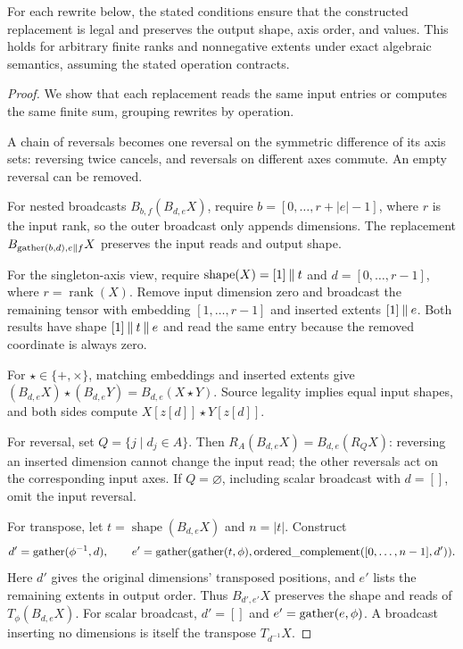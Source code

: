 \begin{lemma}
\label{lem:certified-extensions}
For each rewrite below, the stated conditions ensure that the
constructed replacement is legal and preserves the output shape,
axis order, and values. This holds for arbitrary finite ranks and
nonnegative extents under exact algebraic semantics, assuming
the stated operation contracts.
\end{lemma}
\begin{proof}
We show that each replacement reads the same input entries or computes
the same finite sum, grouping rewrites by operation.

A chain of reversals becomes one reversal on the symmetric difference
of its axis sets: reversing twice cancels, and reversals on different
axes commute. An empty reversal can be removed.

For nested broadcasts $B_{b,f}(B_{d,e}X)$, require
$b=[0,\ldots,r+|e|-1]$, where $r$ is the input rank, so the outer broadcast
only appends dimensions. The replacement $B_{\operatorname{gather}(b,d),e\mathbin{\Vert} f}X$
preserves the input reads and output shape.

For the singleton-axis view, require
$\operatorname{shape}(X)=[1]\mathbin{\Vert} t$ and $d=[0,\ldots,r-1]$,
where $r=\operatorname{rank}(X)$.
Remove input dimension zero and broadcast the remaining tensor with
embedding $[1,\ldots,r-1]$ and inserted extents $[1]\mathbin{\Vert} e$.
Both results have shape $[1]\mathbin{\Vert} t\mathbin{\Vert} e$ and read the same entry
because the removed coordinate is always zero.

For $\star\in\{+,\times\}$, matching embeddings and inserted extents give
$(B_{d,e}X)\star(B_{d,e}Y)=B_{d,e}(X\star Y)$.
Source legality implies equal input shapes, and both sides compute
$X[z[d]]\star Y[z[d]]$.

For reversal, set $Q=\{j\mid d_j\in A\}$. Then
$R_A(B_{d,e}X)=B_{d,e}(R_QX)$: reversing an inserted dimension cannot
change the input read; the other reversals act on the corresponding input
axes. If $Q=\varnothing$, including scalar broadcast with $d=[]$, omit
the input reversal.

For transpose, let $t=\operatorname{shape}(B_{d,e}X)$ and $n=|t|$.
Construct
\[
 d'=\operatorname{gather}(\phi^{-1},d),\qquad
 e'=\operatorname{gather}(\operatorname{gather}(t,\phi),\operatorname{ordered\_complement}([0,\ldots,n-1],d')).
\]
Here $d'$ gives the original dimensions' transposed positions, and $e'$
lists the remaining extents in output order. Thus $B_{d',e'}X$ preserves
the shape and reads of $T_\phi(B_{d,e}X)$.
For scalar broadcast, $d'=[]$ and
$e'=\operatorname{gather}(e,\phi)$. A broadcast inserting no dimensions is itself the
transpose $T_{d^{-1}}X$.


\end{proof}
